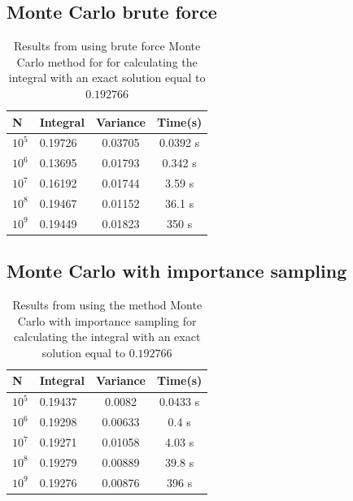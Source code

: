 \documentclass[twoside,twocolumn]{article}
\begin{document}
\subsection{Monte Carlo brute force}

\begin{table}[h]
\centering
\begin{tabular}{|l|l|c|c|}
\hline
N                     & Integral & \multicolumn{1}{l|}{Variance} & Time(s)  \\ \hline
$10^5$ & 0.19726  & 0.03705                       & 0.0392 s \\ \hline
$10^6$ & 0.13695  & 0.01793                       & 0.342 s  \\ \hline
$10^7$ & 0.16192  & 0.01744                       & 3.59 s   \\ \hline
$10^8$ &0.19467  & 0.01152                       & 36.1 s   \\ \hline
$10^9$ & 0.19449  & 0.01823                       & 350 s    \\ \hline
\end{tabular}
\caption{Results from using brute force Monte Carlo method for for calculating the integral with an exact solution equal to $0.192766$}
\end{table}

\subsection{Monte Carlo with importance sampling}
\begin{table}[h]
\centering
\begin{tabular}{|l|l|c|c|}
\hline
N                     & Integral & \multicolumn{1}{l|}{Variance} & Time(s)  \\ \hline
$10^5$ & 0.19437  & 0.0082                        & 0.0433 s \\ \hline
$10^6$ & 0.19298  & 0.00633                       & 0.4 s    \\ \hline
$10^7$ & 0.19271  & 0.01058                       & 4.03 s   \\ \hline
$10^8$ & 0.19279  & 0.00889                       & 39.8 s   \\ \hline
$10^9$ & 0.19276  & 0.00876                       & 396 s    \\ \hline
\end{tabular}
\caption{Results from using the method Monte Carlo with importance sampling for calculating the integral with an exact solution equal to $0.192766$}
\end{table}
\blindtext %
\end{document}
